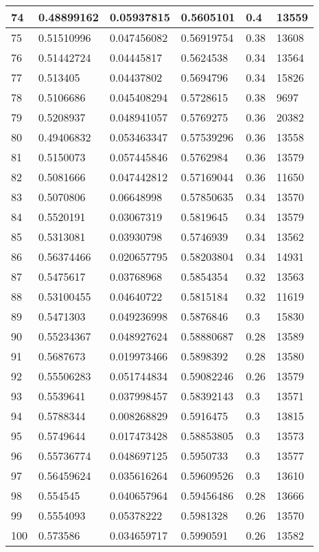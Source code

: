 \begin{longtable}{|l|l|l|l|l|l|}
74 & 0.48899162 & 0.05937815 & 0.5605101 & 0.4 & 13559 \\ \hline 
75 & 0.51510996 & 0.047456082 & 0.56919754 & 0.38 & 13608 \\ \hline 
76 & 0.51442724 & 0.04445817 & 0.5624538 & 0.34 & 13564 \\ \hline 
77 & 0.513405 & 0.04437802 & 0.5694796 & 0.34 & 15826 \\ \hline 
78 & 0.5106686 & 0.045408294 & 0.5728615 & 0.38 & 9697 \\ \hline 
79 & 0.5208937 & 0.048941057 & 0.5769275 & 0.36 & 20382 \\ \hline 
80 & 0.49406832 & 0.053463347 & 0.57539296 & 0.36 & 13558 \\ \hline 
81 & 0.5150073 & 0.057445846 & 0.5762984 & 0.36 & 13579 \\ \hline 
82 & 0.5081666 & 0.047442812 & 0.57169044 & 0.36 & 11650 \\ \hline 
83 & 0.5070806 & 0.06648998 & 0.57850635 & 0.34 & 13570 \\ \hline 
84 & 0.5520191 & 0.03067319 & 0.5819645 & 0.34 & 13579 \\ \hline 
85 & 0.5313081 & 0.03930798 & 0.5746939 & 0.34 & 13562 \\ \hline 
86 & 0.56374466 & 0.020657795 & 0.58203804 & 0.34 & 14931 \\ \hline 
87 & 0.5475617 & 0.03768968 & 0.5854354 & 0.32 & 13563 \\ \hline 
88 & 0.53100455 & 0.04640722 & 0.5815184 & 0.32 & 11619 \\ \hline 
89 & 0.5471303 & 0.049236998 & 0.5876846 & 0.3 & 15830 \\ \hline 
90 & 0.55234367 & 0.048927624 & 0.58880687 & 0.28 & 13589 \\ \hline 
91 & 0.5687673 & 0.019973466 & 0.5898392 & 0.28 & 13580 \\ \hline 
92 & 0.55506283 & 0.051744834 & 0.59082246 & 0.26 & 13579 \\ \hline 
93 & 0.5539641 & 0.037998457 & 0.58392143 & 0.3 & 13571 \\ \hline 
94 & 0.5788344 & 0.008268829 & 0.5916475 & 0.3 & 13815 \\ \hline 
95 & 0.5749644 & 0.017473428 & 0.58853805 & 0.3 & 13573 \\ \hline 
96 & 0.55736774 & 0.048697125 & 0.5950733 & 0.3 & 13577 \\ \hline 
97 & 0.56459624 & 0.035616264 & 0.59609526 & 0.3 & 13610 \\ \hline 
98 & 0.554545 & 0.040657964 & 0.59456486 & 0.28 & 13666 \\ \hline 
99 & 0.5554093 & 0.05378222 & 0.5981328 & 0.26 & 13570 \\ \hline 
100 & 0.573586 & 0.034659717 & 0.5990591 & 0.26 & 13582 \\ \hline 
\end{longtable}